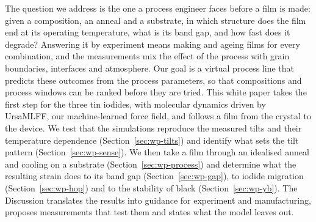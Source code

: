 The question we address is the one a process engineer faces before a film is made: given a composition, an anneal and
a substrate, in which structure does the film end at its operating temperature, what is its band gap, and how fast
does it degrade? Answering it by experiment means making and ageing films for every combination, and the
measurements mix the effect of the process with grain boundaries, interfaces and atmosphere. Our goal is a virtual
process line that predicts these outcomes from the process parameters, so that compositions and process windows can be
ranked before they are tried. This white paper takes the first step for the three tin iodides, with molecular
dynamics driven by UrsaMLFF, our machine-learned force field, and follows a film from the crystal to the device. We
test that the simulations reproduce the measured tilts and their temperature dependence (Section~\ref{sec:wp-tilts}) and
identify what sets the tilt pattern (Section~\ref{sec:wp-sense}). We then take a film through an idealised anneal and
cooling on a substrate (Section~\ref{sec:wp-process}) and determine what the resulting strain does to its band gap
(Section~\ref{sec:wp-gap}), to iodide migration (Section~\ref{sec:wp-hop}) and to the stability of black \CsSnI{}
(Section~\ref{sec:wp-yb}). The Discussion translates the results into guidance for experiment and manufacturing, proposes
measurements that test them and states what the model leaves out.

